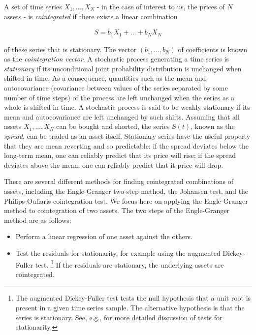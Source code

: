 \documentclass{article}
\begin{document}
A set of time series $X_{1}, ... , X_{N}$ - in the case of interest to us, the prices of $N$ assets - is \textit{cointegrated} if there exists a linear combination 

\begin{align}
S = b_{1} X_{1} + ... + b_{N} X_{N}
\end{align}

\noindent of these series that is stationary. The vector $(b_{1}, ..., b_{N})$ of coefficients is known as the \textit{cointegration vector}. A stochastic process generating a time series is \textit{stationary} if its unconditional joint probability distribution is unchanged when shifted in time. As a consequence, quantities such as the mean and autocovariance (covariance between values of the series separated by some number of time steps) of the process are left unchanged when the series as a whole is shifted in time. A stochastic process is said to be weakly stationary if its mean and autocovariance are left unchanged by such shifts. Assuming that all assets $X_{1}, ... , X_{N}$ can be bought and shorted, the series $S(t)$, known as the \textit{spread}, can be traded as an asset itself. Stationary series have the useful property that they are mean reverting and so predictable: if the spread deviates below the long-term mean, one can reliably predict that its price will rise; if the spread deviates above the mean, one can reliably predict that it price will drop. 

There are several different methods for finding cointegrated combinations of assets, including the Engle-Granger two-step method, the Johansen test, and the Philips-Ouliaris cointegration test. We focus here on applying the Engle-Granger method to cointegration of two assets. The two steps of the Engle-Granger method are as follows:

\begin{itemize}
\item Perform a linear regression of one asset against the others. 
\item Test the residuals for stationarity, for example using the augmented Dickey-Fuller test.
\footnote{The augmented Dickey-Fuller test tests the null hypothesis that a unit root is present in a given time series sample. The alternative hypothesis is that the series is stationary. See, e.g., \cite{hamilton1994time} for more detailed discussion of tests for stationarity. 
} 
If the residuals are stationary, the underlying assets are cointegrated. 
\end{itemize}
\end{document}
